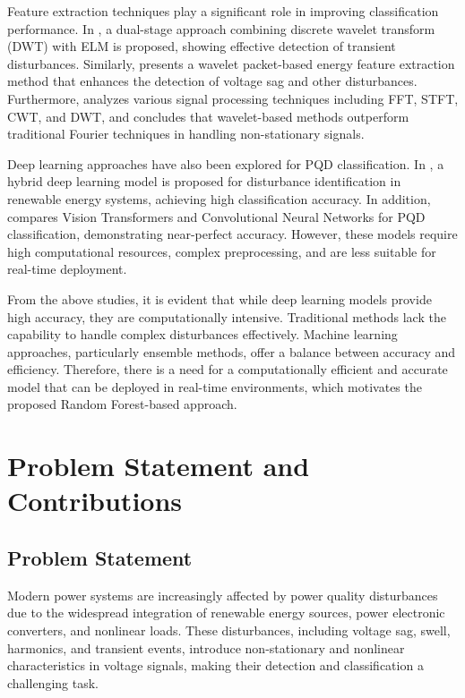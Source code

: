 \documentclass[conference]{IEEEtran}
\begin{document}
Feature extraction techniques play a significant role in improving classification performance. In \cite{b6}, a dual-stage approach combining discrete wavelet transform (DWT) with ELM is proposed, showing effective detection of transient disturbances. Similarly, \cite{b9} presents a wavelet packet-based energy feature extraction method that enhances the detection of voltage sag and other disturbances. Furthermore, \cite{b8} analyzes various signal processing techniques including FFT, STFT, CWT, and DWT, and concludes that wavelet-based methods outperform traditional Fourier techniques in handling non-stationary signals.

Deep learning approaches have also been explored for PQD classification. In \cite{b4}, a hybrid deep learning model is proposed for disturbance identification in renewable energy systems, achieving high classification accuracy. In addition, \cite{b10} compares Vision Transformers and Convolutional Neural Networks for PQD classification, demonstrating near-perfect accuracy. However, these models require high computational resources, complex preprocessing, and are less suitable for real-time deployment.

From the above studies, it is evident that while deep learning models provide high accuracy, they are computationally intensive. Traditional methods lack the capability to handle complex disturbances effectively. Machine learning approaches, particularly ensemble methods, offer a balance between accuracy and efficiency. Therefore, there is a need for a computationally efficient and accurate model that can be deployed in real-time environments, which motivates the proposed Random Forest-based approach.
\section{Problem Statement and Contributions}

\subsection{Problem Statement}

Modern power systems are increasingly affected by power quality disturbances due to the widespread integration of renewable energy sources, power electronic converters, and nonlinear loads. These disturbances, including voltage sag, swell, harmonics, and transient events, introduce non-stationary and nonlinear characteristics in voltage signals, making their detection and classification a challenging task.
\end{document}
